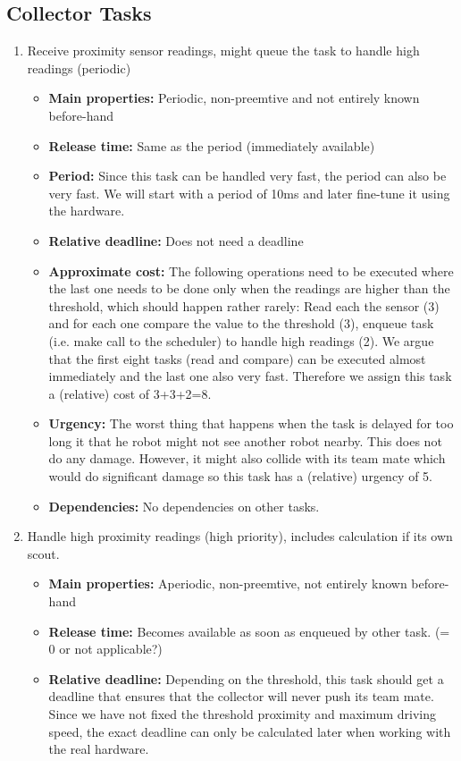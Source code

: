 \documentclass[12pt]{article}
\begin{document}
\subsection*{Collector Tasks}
\begin{enumerate}
  \item Receive proximity sensor readings, might queue the task to handle high readings (periodic)
  	\begin{itemize}
  	\item \textbf{Main properties:} Periodic, non-preemtive and not entirely known before-hand
  	\item \textbf{Release time:} Same as the period (immediately available)
  	\item \textbf{Period:} Since this task can be handled very fast, the period can also be very fast. We will start with a period of 10ms and later fine-tune it using the hardware.
  	\item \textbf{Relative deadline:} Does not need a deadline
  	\item \textbf{Approximate cost:} The following operations need to be executed where the last one needs to be done only when the readings are higher than the threshold, which should happen rather rarely: Read each the sensor (3) and for each one compare the value to the threshold (3), enqueue task (i.e. make call to the scheduler) to handle high readings (2). We argue that the first eight tasks (read and compare) can be executed almost immediately and the last one also very fast. Therefore we assign this task a (relative) cost of 3+3+2=8.
  	\item \textbf{Urgency:} The worst thing that happens when the task is delayed for too long it that he robot might not see another robot nearby. This does not do any damage. However, it might also collide with its team mate which would do significant damage so this task has a (relative) urgency of 5.
  	\item \textbf{Dependencies:} No dependencies on other tasks.
  	\end{itemize}
  \item Handle high proximity readings (high priority), includes calculation if its own scout.
  	\begin{itemize}
  	\item \textbf{Main properties:} Aperiodic, non-preemtive, not entirely known before-hand
  	\item \textbf{Release time:} Becomes available as soon as enqueued by other task. (= 0 or not applicable?)
  	\item \textbf{Relative deadline:} Depending on the threshold, this task should get a deadline that ensures that the collector will never push its team mate. Since we have not fixed the threshold proximity and maximum driving speed, the exact deadline can only be calculated later when working with the real hardware.

\end{itemize}
\end{enumerate}
\end{document}
